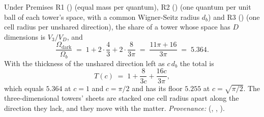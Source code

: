 Under Premises R1 () (equal mass per quantum), R2 () (one quantum per unit ball of each tower's space, with a common Wigner-Seitz radius $d_{b}$) and R3 () (one cell radius per unshared direction), the share of a tower whose space has $D$ dimensions is $V_{3}/V_{D}$, and
\[
\frac{\Omega_{\mathrm{dark}}}{\Omega_{b}} \;=\; 1 + 2\cdot\frac{4}{3} + 2\cdot\frac{8}{3\pi} \;=\; \frac{11\pi + 16}{3\pi} \;=\; 5.364 .
\]
With the thickness of the unshared direction left as $c\,d_{b}$ the total is
\[
T(c) \;=\; 1 + \frac{8}{3c} + \frac{16c}{3\pi},
\]
which equals $5.364$ at $c = 1$ and $c = \pi/2$ and has its floor $5.255$ at $c = \sqrt{\pi/2}$. The three-dimensional towers' sheets are stacked one cell radius apart along the direction they lack, and they move with the matter. \emph{Provenance:} \cite[Prems.~7.2 to 7.4, Props.~7.6, 7.15 and 7.28]{ButlerT14} (, , ).

